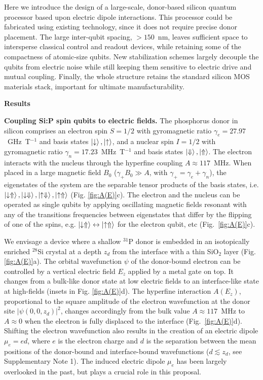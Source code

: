 \documentclass[aps,prb,superscriptaddress,nobibnotes,preprint]{revtex4-1}%
\begin{document}
Here we introduce the design of a large-scale, donor-based silicon quantum processor based upon electric dipole interactions. This processor could be fabricated using existing technology, since it does not require precise donor placement. The large inter-qubit spacing, $>150$~nm, leaves sufficient space to intersperse classical control and readout devices, while retaining some of the compactness of atomic-size qubits. New stabilization schemes largely decouple the qubits from electric noise while still keeping them sensitive to electric drive and mutual coupling. Finally, the whole structure retains the standard silicon MOS materials stack, important for ultimate manufacturability.


\vspace{3mm}
\noindent\textbf{\large Results}

\noindent\textbf{Coupling Si:P spin qubits to electric fields.}
%
The phosphorus donor in silicon comprises an electron spin $S = 1/2$ with gyromagnetic ratio $\gamma_e=27.97$~GHz~T$^{-1}$ and basis states $\ket{\downarrow}, \ket{\uparrow}$, and a nuclear spin $I = 1/2$ with gyromagnetic ratio $\gamma_n=17.23$~MHz~T$^{-1}$ and basis states $\ket{\Downarrow}, \ket{\Uparrow}$. The electron interacts with the nucleus through the hyperfine coupling $A\approx 117$~MHz. When placed in a large magnetic field $B_0$ ($\gamma_+ B_0 \gg A$, with $\gamma_+=\gamma_e+\gamma_n$), the eigenstates of the system are the separable tensor products of the basis states, i.e. $\ket{\downarrow \Uparrow}, \ket{\downarrow \Downarrow}, \ket{\uparrow \Downarrow}, \ket{\uparrow \Uparrow}$ (Fig. \ref{fig:A(E)}c). The electron and the nucleus can be operated as single qubits by applying oscillating magnetic fields resonant with any of the transitions frequencies between eigenstates that differ by the flipping of one of the spins, e.g. $\ket{\downarrow \Uparrow} \leftrightarrow \ket{\uparrow \Uparrow}$ for the electron qubit, etc (Fig.~\ref{fig:A(E)}c).

We envisage a device where a shallow $^{31}$P donor is embedded in an isotopically enriched $^{28}$Si crystal at a depth $z_d$ from the interface with a thin SiO$_2$ layer (Fig. \ref{fig:A(E)}a). The orbital wavefunction $\psi$ of the donor-bound electron can be controlled by a vertical electric field $E_z$ applied by a metal gate on top. It changes from a bulk-like donor state at low electric fields to an interface-like state at high-fields \cite{Calderon2006,Lansbergen2008} (insets in Fig. \ref{fig:A(E)}d). The hyperfine interaction $A(E_z)$, proportional to the square amplitude of the electron wavefunction at the donor site $|\psi(0,0,z_d)|^2$, changes accordingly from the bulk value $A \approx 117$~MHz to $A \approx 0$ when the electron is fully displaced to the interface (Fig.~\ref{fig:A(E)}d). Shifting the electron wavefunction also results in the creation of an electric dipole $\mu_e = ed$, where $e$ is the electron charge and $d$ is the separation between the mean positions of the donor-bound and interface-bound wavefunctions ($d \lesssim z_d$, see Supplementary Note 1). The induced electric dipole $\mu_e$ has been largely overlooked in the past, but plays a crucial role in this proposal.
\end{document}
